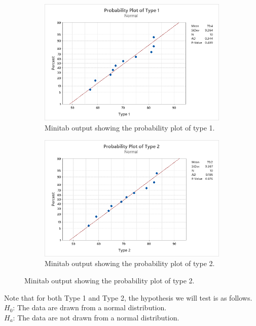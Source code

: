 \documentclass{article}
\begin{document}
\begin{figure}[h]
    \centering
    \begin{subfigure}[b]{0.4\textwidth}
        \includegraphics[width=1.25\textwidth]{./images/3_c_1.png}
        \caption{Minitab output showing the probability plot of type 1.}
      \label{fig:img1}
    \end{subfigure}
    \hfill
    \begin{subfigure}[b]{0.4\textwidth}
        \includegraphics[width=1.25\textwidth]{./images/3_c_2.png}
        \caption{Minitab output showing the probability plot of type 2.}
      \label{fig:img2}
    \end{subfigure}
    \label{fig:both}
  \end{figure}

  Note that for both Type 1 and Type 2, the hypothesis we will test is as follows. \\
  $H_0$: The data are drawn from a normal distribution. \\
  $H_a$: The data are not drawn from a normal distribution. 
\end{document}
